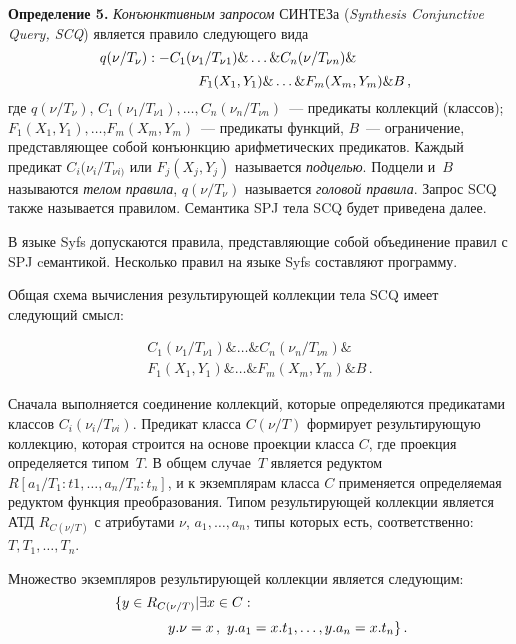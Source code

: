 \begin{multicols}{2}
\bigskip

\noindent
\textbf{Определение 5.} \textit{Конъюнктивным запросом} СИНТЕЗа
(\textit{Synthesis Conjunctive Query, SCQ}) является правило следующего вида
$$
q(\nu /T_\nu ):- C_1(\nu_1/T_{\nu 1})\& \ldots \& C_n(\nu/T_{\nu n})\&\hspace*{45pt}
$$
$$ \hspace*{65pt}F_1(X_1,Y_1)\&
\ldots \& F_m(X_m,Y_m)\& B \,,
$$%
     где $q(\nu /T_\nu )$, $C_1(\nu_1/T_{\nu 1}),\ldots , C_n(\nu_n/T_{\nu n})$~--- предикаты
коллекций (классов); $F_1(X_1,Y_1), \ldots $,\linebreak $ F_m(X_m,Y_m)$~--- предикаты функций,
     $B$~--- ограничение, представляющее собой конъюнкцию арифметических
предикатов. Каждый предикат $C_i(\nu_i/T_{\nu i)}$ или $F_j(X_j,Y_j)$ называется
\textit{подцелью}. Подцели и~$B$ называются \textit{телом правила},
$q(\nu /T_\nu )$ называется \textit{головой правила}.
Запрос SCQ также называется правилом.  Семантика SPJ тела SCQ будет приведена
далее.

В языке Syfs допускаются правила, пред\-став\-ля\-ющие собой объединение правил с
SPJ cемантикой. Несколько правил на языке Syfs составляют программу.

     Общая схема вычисления результирующей коллекции тела SCQ имеет следующий
смысл:

\noindent
\begin{multline*}
C_1(\nu_1/T_{\nu 1}) \& \ldots \& C_n(\nu_n/T_{\nu n}) \&
\\[3pt]
F_1(X_1,Y_1) \&\ldots \& F_m(X_m,Y_m )\& B\,.
\end{multline*}

Сначала выполняется соединение коллекций, которые определяются
предикатами классов $C_i(\nu_i/T_{\nu i})$. Предикат класса $C(\nu /T)$ формирует
результирующую коллекцию, которая строится на основе проекции класса $C$, где
проекция определяется типом~$T$. В общем случае~$T$ является редуктом $R[a_1/T_1:t1,
\ldots , a_n/T_{n}:t_n]$, и к экземплярам класса $C$ применяется определяемая ре\-дуктом
функция преобразования. Типом ре\-зуль\-тиру\-ющей коллекции
является АТД $R_{C(\nu /T)}$ с атрибутами $\nu$, $a_1, \ldots , a_n$, типы которых есть,
соответственно: $T, T_1, \ldots , T_n$.

Множество экземпляров результирующей коллекции
является следующим:
$$%
\{y\in  R_{C(\nu /T)}  \vert  \exists x\in C:\hspace*{110pt}
$$%
$$\hspace*{40pt}y.\nu =x\,,\ y.a_1=x.t_1, \ldots , y.a_n=x.t_n\}\,.
$$%


\end{multicols}
